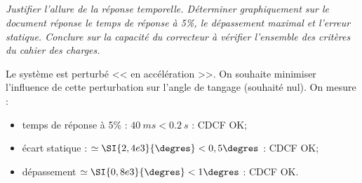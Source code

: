 \begin{multicols}{2}
\subparagraph{} \textit{Justifier l'allure de la réponse temporelle. Déterminer graphiquement sur le document réponse le temps de réponse à 5\%, le dépassement maximal et l'erreur statique. Conclure sur la capacité du correcteur à
vérifier l'ensemble des critères du cahier des charges.}
\ifprof
\begin{corrige}
Le système est perturbé << en accélération >>. On souhaite minimiser l'influence de cette perturbation sur l'angle de tangage (souhaité nul).
On mesure : 
\begin{itemize}
\item temps de réponse à 5\% : $\SI{40}{ms} <\SI{0,2}{s}$ : CDCF OK;
\item écart statique : $\simeq \SI{2,4e3}{\degres} <0,5\degres$ : CDCF OK;
\item dépassement $\simeq \SI{0,8e3}{\degres} <1\degres$ : CDCF OK.
\end{itemize}
\end{corrige}
\else
\fi



\ifprof
\else
\end{multicols}
\fi

